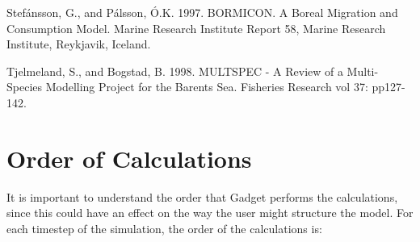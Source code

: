 \documentclass[10pt,twoside]{book}
\begin{document}
Stef\'{a}nsson, G., and P\'{a}lsson, \'{O}.K. 1997. BORMICON. A Boreal Migration and Consumption Model. Marine Research Institute Report 58, Marine Research Institute, Reykjavik, Iceland.\newline

Tjelmeland, S., and Bogstad, B. 1998. MULTSPEC - A Review of a Multi-Species Modelling Project for the Barents Sea. Fisheries Research vol 37: pp127-142.\newline

\appendix
\chapter{Order of Calculations}\label{chap:order}
It is important to understand the order that Gadget performs the calculations, since this could have an effect on the way the user might structure the model.  For each timestep of the simulation, the order of the calculations is:
\end{document}
